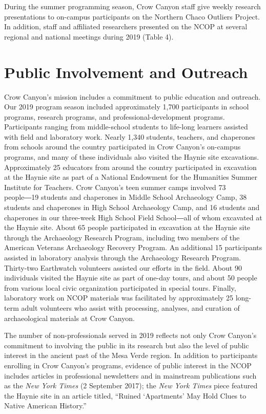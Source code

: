 \documentclass[
  12pt,
]{krantz}
\begin{document}
During the summer programming season, Crow Canyon staff give weekly
research presentations to on-campus participants on the Northern Chaco
Outliers Project. In addition, staff and affiliated researchers
presented on the NCOP at several regional and national meetings during
2019 (Table 4).

\hypertarget{public-involvement-and-outreach}{%
\section{Public Involvement and Outreach}\label{public-involvement-and-outreach}}

Crow Canyon's mission includes a commitment to public education and
outreach. Our 2019 program season included approximately 1,700
participants in school programs, research programs, and
professional-development programs. Participants ranging from
middle-school students to life-long learners assisted with field and
laboratory work. Nearly 1,340 students, teachers, and chaperones from
schools around the country participated in Crow Canyon's on-campus
programs, and many of these individuals also visited the Haynie site
excavations. Approximately 25 educators from around the country
participated in excavation at the Haynie site as part of a National
Endowment for the Humanities Summer Institute for Teachers. Crow
Canyon's teen summer camps involved 73 people―19 students and chaperones
in Middle School Archaeology Camp, 38 students and chaperones in High
School Archaeology Camp, and 16 students and chaperones in our
three-week High School Field School―all of whom excavated at the Haynie
site. About 65 people participated in excavation at the Haynie site
through the Archaeology Research Program, including two members of the
American Veterans Archaeology Recovery Program. An additional 15
participants assisted in laboratory analysis through the Archaeology
Research Program. Thirty-two Earthwatch volunteers assisted our efforts
in the field. About 90 individuals visited the Haynie site as part of
one-day tours, and about 50 people from various local civic organization
participated in special tours. Finally, laboratory work on NCOP
materials was facilitated by approximately 25 long-term adult volunteers
who assist with processing, analyses, and curation of archaeological
materials at Crow Canyon.

The number of non-professionals served in 2019 reflects not only Crow
Canyon's commitment to involving the public in its research but also the
level of public interest in the ancient past of the Mesa Verde region.
In addition to participants enrolling in Crow Canyon's programs,
evidence of public interest in the NCOP includes articles in
professional newsletters and in mainstream publications such as the \emph{New
York Times} (2 September 2017); the \emph{New York Times} piece featured the
Haynie site in an article titled, ``Ruined `Apartments' May Hold Clues to
Native American History.''
\end{document}
